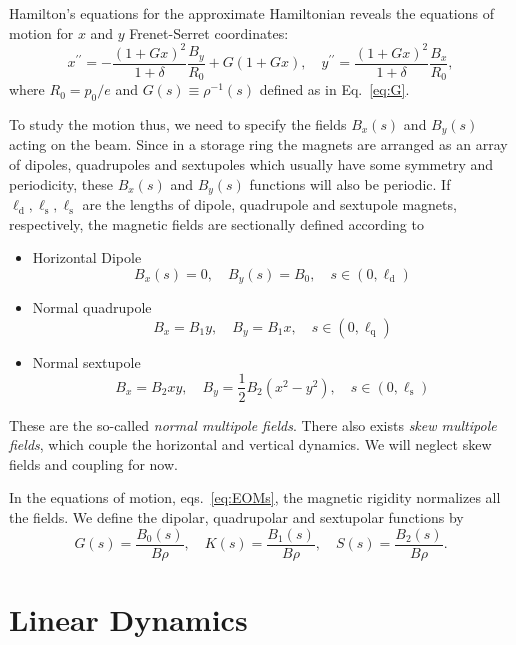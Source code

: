 Hamilton's equations for the approximate Hamiltonian reveals the equations of motion for $x$ and $y$ Frenet-Serret coordinates:
\begin{equation}
x^{\prime \prime}=-\frac{(1+G x)^{2}}{1+\delta} \frac{B_{y}}{R_0}+G(1+G x),
\quad
y^{\prime \prime}=\frac{(1+G x)^{2}}{1+\delta} \frac{B_{x}}{R_0},
\label{eq:EOMs}
\end{equation}
where $R_0 = p_0/e$ and $G(s)\equiv\rho^{-1}(s)$ defined as in Eq.~\eqref{eq:G}.

To study the motion thus, we need to specify the fields $B_x(s)$ and $B_y(s)$ acting on the beam. Since in a storage ring the magnets are arranged as an array of dipoles, quadrupoles and sextupoles which usually have some symmetry and periodicity, these $B_x(s)$ and $B_y(s)$ functions will also be periodic. If $\ell_{\text{d}}, \ell_{\text{s}}, \ell_{\text{s}}$ are the lengths of dipole, quadrupole and sextupole magnets, respectively, the magnetic fields are sectionally defined according to
\begin{itemize}
    \item Horizontal Dipole
           $$ B_x(s) = 0, \quad B_y(s) = B_0, \quad s\in(0,\ell_{\text{d}})$$
    \item Normal quadrupole
          $$B_x = B_1 y, \quad B_y = B_1 x, \quad s\in(0,\ell_{\text{q}})$$
    \item Normal sextupole
          $$B_x = B_2xy, \quad B_y = \frac{1}{2}B_2(x^2 - y^2), \quad s\in(0,\ell_{\text{s}})$$
\end{itemize}
These are the so-called \textit{normal multipole fields}. There also exists \textit{skew multipole fields}, which couple the horizontal and vertical dynamics. We will neglect skew fields and coupling for now.

In the equations of motion, eqs.~\eqref{eq:EOMs}, the magnetic rigidity normalizes all the fields. We define the dipolar, quadrupolar and sextupolar functions by
\begin{equation}
    G(s) = \frac{B_0(s)}{B\rho}, \quad K(s) = \frac{B_1(s)}{B\rho}, \quad S(s) = \frac{B_2(s)}{B\rho}.
    \label{eq:mag_funcs}
\end{equation}

\section{Linear Dynamics}
